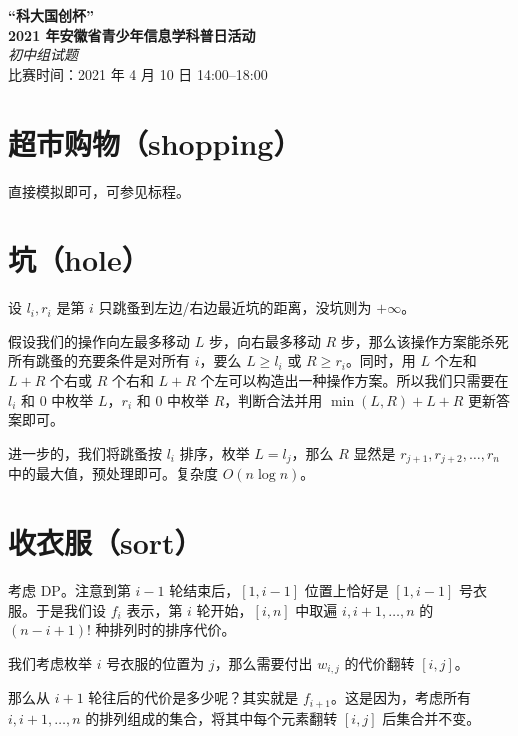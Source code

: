\documentclass[11pt,a4paper,oneside]{article}
\begin{document}
\begin{center}
  \textbf{\huge “科大国创杯” \\ 2021 年安徽省青少年信息学科普日活动}\\
    {\LARGE \textit{初中组试题}\\\vspace{1em}}
    {\Large 比赛时间：2021 年 4 月 10 日 14:00–18:00}
  \end{center}

\section{超市购物（shopping）}

直接模拟即可，可参见标程。

\section{坑（hole）}

设 $l_i,r_i$ 是第 $i$ 只跳蚤到左边/右边最近坑的距离，没坑则为 $+\infty$。

假设我们的操作向左最多移动 $L$ 步，向右最多移动 $R$ 步，那么该操作方案能杀死所有跳蚤的充要条件是对所有 $i$，要么 $L \ge l_i$ 或 $R \ge r_i$。同时，用 $L$ 个左和 $L+R$ 个右或 $R$ 个右和 $L+R$ 个左可以构造出一种操作方案。所以我们只需要在 $l_i$ 和 $0$ 中枚举 $L$，$r_i$ 和 $0$ 中枚举 $R$，判断合法并用 $\min(L,R)+L+R$ 更新答案即可。

进一步的，我们将跳蚤按 $l_i$ 排序，枚举 $L=l_j$，那么 $R$ 显然是 $r_{j+1},r_{j+2},\ldots,r_n$ 中的最大值，预处理即可。复杂度 $O(n \log n)$。

\section{收衣服（sort）}

考虑 DP。注意到第 $i-1$ 轮结束后，$[1,i-1]$ 位置上恰好是 $[1,i-1]$ 号衣服。于是我们设 $f_i$ 表示，第 $i$ 轮开始，$[i,n]$ 中取遍 $i,i+1,\ldots,n$ 的 $(n-i+1)!$ 种排列时的排序代价。

我们考虑枚举 $i$ 号衣服的位置为 $j$，那么需要付出 $w_{i,j}$ 的代价翻转 $[i,j]$。

那么从 $i+1$ 轮往后的代价是多少呢？其实就是 $f_{i+1}$。这是因为，考虑所有 $i,i+1,\ldots,n$ 的排列组成的集合，将其中每个元素翻转 $[i,j]$ 后集合并不变。
\end{document}
